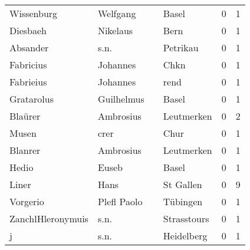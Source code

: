 \begin{center}
\begin{tiny}
\begin{longtabu}{llllrr}
               Wissenburg &                           Welfgang &             &                                       Basel &          0 &         1 \\
                 Diesbaeh &                           Nikelaus &             &                                        Bern &          0 &         1 \\
                 Absander &                               s.n. &             &                                    Petrikau &          0 &         1 \\
                Fabricius &                           Johannes &             &                                        Chkn &          0 &         1 \\
                Fabrieius &                           Johannes &             &                                        rend &          0 &         1 \\
               Gratarolus &                         Guilhelmus &             &                                       Basel &          0 &         1 \\
                  Blaürer &                          Ambrosius &             &                                  Leutmerken &          0 &         2 \\
                    Musen &                               crer &             &                                        Chur &          0 &         1 \\
                  Blanrer &                          Ambrosius &             &                                  Leutmerken &          0 &         1 \\
                    Hedio &                              Euseb &             &                                       Basel &          0 &         1 \\
                    Liner &                               Hans &             &                                   St Gallen &          0 &         9 \\
                 Vorgerio &                        Plefl Paolo &             &                                    Tübingen &          0 &         1 \\
        ZanchlHleronymuis &                               s.n. &             &                                 Strasstours &          0 &         1 \\
                        j &                               s.n. &             &                                  Heidelberg &          0 &         1 \\

\end{longtabu}
\end{tiny}
\end{center}

